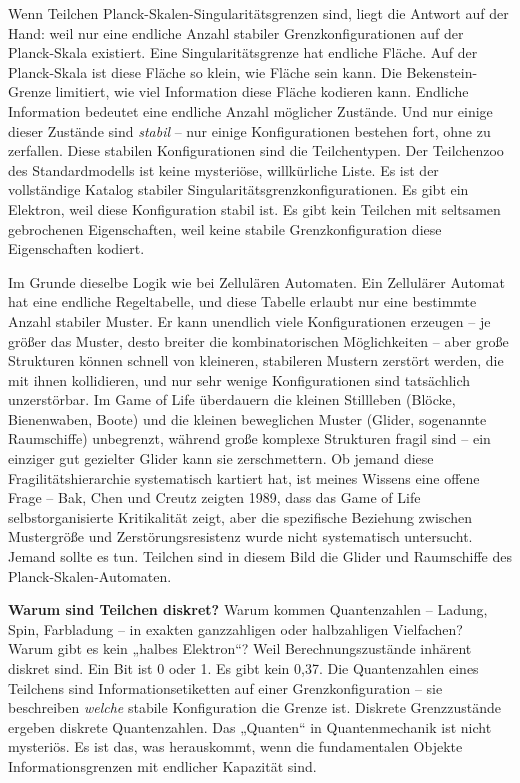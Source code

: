 \documentclass[11pt, twoside, openright]{book}
\begin{document}
Wenn Teilchen Planck-Skalen-Singularitätsgrenzen sind, liegt die Antwort auf der Hand: weil nur eine endliche Anzahl stabiler Grenzkonfigurationen auf der Planck-Skala existiert. Eine Singularitätsgrenze hat endliche Fläche. Auf der Planck-Skala ist diese Fläche so klein, wie Fläche sein kann. Die Bekenstein-Grenze limitiert, wie viel Information diese Fläche kodieren kann. Endliche Information bedeutet eine endliche Anzahl möglicher Zustände. Und nur einige dieser Zustände sind \textit{stabil} -- nur einige Konfigurationen bestehen fort, ohne zu zerfallen. Diese stabilen Konfigurationen sind die Teilchentypen. Der Teilchenzoo des Standardmodells ist keine mysteriöse, willkürliche Liste. Es ist der vollständige Katalog stabiler Singularitätsgrenzkonfigurationen. Es gibt ein Elektron, weil diese Konfiguration stabil ist. Es gibt kein Teilchen mit seltsamen gebrochenen Eigenschaften, weil keine stabile Grenzkonfiguration diese Eigenschaften kodiert.

Im Grunde dieselbe Logik wie bei Zellulären Automaten. Ein Zellulärer Automat hat eine endliche Regeltabelle, und diese Tabelle erlaubt nur eine bestimmte Anzahl stabiler Muster. Er kann unendlich viele Konfigurationen erzeugen -- je größer das Muster, desto breiter die kombinatorischen Möglichkeiten -- aber große Strukturen können schnell von kleineren, stabileren Mustern zerstört werden, die mit ihnen kollidieren, und nur sehr wenige Konfigurationen sind tatsächlich unzerstörbar. Im Game of Life überdauern die kleinen Stillleben (Blöcke, Bienenwaben, Boote) und die kleinen beweglichen Muster (Glider, sogenannte Raumschiffe) unbegrenzt, während große komplexe Strukturen fragil sind -- ein einziger gut gezielter Glider kann sie zerschmettern. Ob jemand diese Fragilitätshierarchie systematisch kartiert hat, ist meines Wissens eine offene Frage -- Bak, Chen und Creutz zeigten 1989, dass das Game of Life selbstorganisierte Kritikalität zeigt, aber die spezifische Beziehung zwischen Mustergröße und Zerstörungsresistenz wurde nicht systematisch untersucht. Jemand sollte es tun. Teilchen sind in diesem Bild die Glider und Raumschiffe des Planck-Skalen-Automaten.

\textbf{Warum sind Teilchen diskret?} Warum kommen Quantenzahlen -- Ladung, Spin, Farbladung -- in exakten ganzzahligen oder halbzahligen Vielfachen? Warum gibt es kein „halbes Elektron“? Weil Berechnungszustände inhärent diskret sind. Ein Bit ist 0 oder 1. Es gibt kein 0,37. Die Quantenzahlen eines Teilchens sind Informationsetiketten auf einer Grenzkonfiguration -- sie beschreiben \textit{welche} stabile Konfiguration die Grenze ist. Diskrete Grenzzustände ergeben diskrete Quantenzahlen. Das „Quanten“ in Quantenmechanik ist nicht mysteriös. Es ist das, was herauskommt, wenn die fundamentalen Objekte Informationsgrenzen mit endlicher Kapazität sind.
\end{document}
